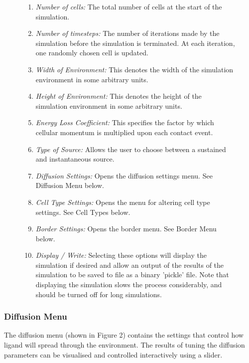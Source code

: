 \documentclass[12pt]{article}
\begin{document}
\begin{figure}[H]
{\begin{enumerate}[topsep=2pt,itemsep=-1ex,partopsep=1ex,parsep=1ex]
\item {\itshape Number of cells:} The total number of cells at the start 
of the simulation.
\item {\itshape Number of timesteps:} The number of iterations made by 
the simulation before the simulation is terminated. At each iteration, 
one randomly chosen cell is updated.
\item {\itshape Width of Environment:} This denotes the width of the 
simulation environment in some arbitrary units.
\item {\itshape Height of Environment:} This denotes the height of the 
simulation environment in some arbitrary units.
\item {\itshape Energy Loss Coefficient:} This specifies the factor by 
which cellular momentum is multiplied upon each contact event.
\item {\itshape Type of Source:} Allows the user to choose between 
a sustained and instantaneous source.
\item {\itshape Diffusion Settings:} Opens the diffusion settings menu. See Diffusion Menu below.
\item {\itshape Cell Type Settings:} Opens the menu for altering cell 
type settings. See Cell Types below.
\item {\itshape Border Settings:} Opens the border menu. See Border Menu below.
\item {\itshape Display / Write:} Selecting these options will display 
the simulation if desired and allow an output of the results of the 
simulation to be saved to file as a binary 'pickle' file. Note that 
displaying the simulation slows the process considerably, and should be 
turned off for long simulations.
\end{enumerate}
}
\end{figure}

\newpage
\subsubsection{Diffusion Menu}
The diffusion menu (shown in Figure 2) contains the settings that control how 
ligand will spread through the environment. The results of 
tuning the diffusion parameters can be visualised and controlled 
interactively using a slider.
\end{document}
